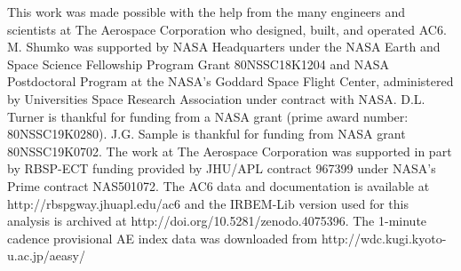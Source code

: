 \documentclass[draft]{agujournal2019}
\begin{document}
\acknowledgments
This work was made possible with the help from the many engineers and scientists at The Aerospace Corporation who designed, built, and operated AC6. M. Shumko was supported by NASA Headquarters under the NASA Earth and Space Science Fellowship Program Grant 80NSSC18K1204 and NASA Postdoctoral Program at the NASA's Goddard Space Flight Center, administered by Universities Space Research Association under contract with NASA. D.L. Turner is thankful for funding from a NASA grant (prime award number: 80NSSC19K0280). J.G. Sample is thankful for funding from NASA grant 80NSSC19K0702. The work at The Aerospace Corporation was supported in part by RBSP-ECT funding provided by JHU/APL contract 967399 under NASA's Prime contract NAS501072. The AC6 data and documentation is available at http://rbspgway.jhuapl.edu/ac6 and the IRBEM-Lib version used for this analysis is archived at http://doi.org/10.5281/zenodo.4075396. The 1-minute cadence provisional AE index data was downloaded from http://wdc.kugi.kyoto-u.ac.jp/aeasy/

%
%
\end{document}

